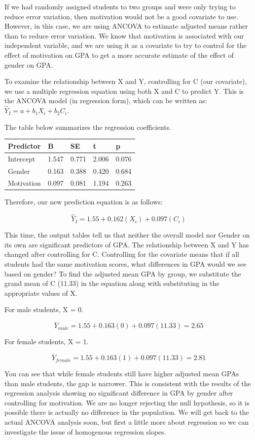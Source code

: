 \documentclass[
  letterpaper,
  DIV=11,
  numbers=noendperiod]{scrreprt}
\begin{document}
If we had randomly assigned students to two groups and were only trying
to reduce error variation, then motivation would not be a good covariate
to use. However, in this case, we are using ANCOVA to estimate adjusted
means rather than to reduce error variation. We know that motivation is
associated with our independent variable, and we are using it as a
covariate to try to control for the effect of motivation on GPA to get a
more accurate estimate of the effect of gender on GPA.\,\,\,

To examine the relationship between X and Y, controlling for C (our
covariate), we use a multiple regression equation using both X and C to
predict Y. This is the ANCOVA model (in regression form), which can be
written as:\,\(\hat{Y}_I = a+ b_1X_i+ b_2C_i\).

The table below summarizes the regression coefficients.

\begin{longtable}[]{@{}lllll@{}}
\toprule\noalign{}
Predictor & B & SE & t & p \\
\midrule\noalign{}
\endhead
\bottomrule\noalign{}
\endlastfoot
Intercept & 1.547 & 0.771 & 2.006 & 0.076 \\
Gender & 0.163 & 0.388 & 0.420 & 0.684 \\
Motivation & 0.097 & 0.081 & 1.194 & 0.263 \\
\end{longtable}

Therefore, our new prediction equation is as follows:\,

\[
\hat{Y}_I = 1.55+0.162(X_i)+0.097(C_i)
\]

This time, the output tables tell us that neither the overall model nor
Gender on its own are significant predictors of GPA. The relationship
between X and Y has changed after controlling for C. Controlling for the
covariate means that if all students had the same motivation scores,
what differences in GPA would we see based on gender? To find the
adjusted mean GPA by group, we substitute the grand mean of C (11.33) in
the equation along with substituting in the appropriate values of X.\,\,

For male students, X = 0.

\[
\bar{Y}_{male} = 1.55 + 0.163(0) + 0.097(11.33) = 2.65
\]

For female students, X = 1.

\[
\bar{Y}_{female} = 1.55 + 0.163(1) + 0.097(11.33) = 2.81
\]

You can see that while female students still have higher adjusted mean
GPAs than male students, the gap is narrower. This is consistent with
the results of the regression analysis showing no significant difference
in GPA by gender after controlling for motivation. We are no longer
rejecting the null hypothesis, so it is possible there is actually no
difference in the population. We will get back to the actual ANCOVA
analysis soon, but first a little more about regression so we can
investigate the issue of homogenous regression slopes.\,\,
\end{document}
